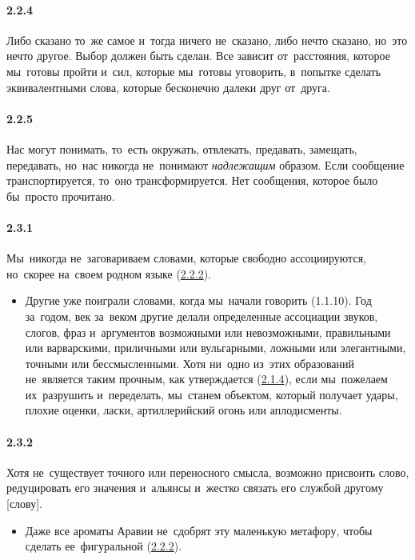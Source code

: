 \paragraph{2.2.4}\hypertarget{par:2.2.4}{} Либо сказано то~же самое и~тогда ничего не~сказано, либо нечто сказано, но~это нечто другое. Выбор должен быть сделан. Все зависит от~расстояния, которое мы~готовы пройти и~сил, которые мы~готовы уговорить, в~попытке сделать эквивалентными слова,
которые бесконечно далеки друг от~друга. 

\paragraph{2.2.5}\hypertarget{par:2.2.5}{} Нас могут понимать, то~есть окружать, отвлекать, предавать, замещать, передавать, но~нас никогда не~понимают {\itshape надлежащим} образом. Если сообщение транспортируется, то~оно трансформируется. Нет сообщения, которое было бы~просто прочитано.

\paragraph{2.3.1}\hypertarget{par:2.3.1}{} Мы~никогда не~заговариваем словами, которые свободно ассоциируются, но~скорее на~своем родном языке (\hyperlink{par:2.2.2}{2.2.2}). 
	\begin{itemize}
	\item 
	Другие уже поиграли словами, когда мы~начали говорить (1.1.10). Год за~годом, век за~веком другие делали определенные ассоциации звуков, слогов, фраз и~аргументов возможными или невозможными, правильными или варварскими, приличными или вульгарными, ложными или элегантными, точными или бессмысленными. Хотя ни~одно из~этих образований не~является таким прочным, как утверждается (\hyperlink{par:2.1.4}{2.1.4}), если мы~пожелаем их~разрушить и~переделать, мы~станем объектом, который получает удары, плохие оценки, ласки, артиллерийский огонь или аплодисменты.
	\end{itemize}

\paragraph{2.3.2}\hypertarget{par:2.3.2}{} Хотя не~существует точного или переносного смысла, возможно присвоить слово, редуцировать его значения и~альянсы и~жестко связать его службой другому [слову]. 
	\begin{itemize}
	\item 
	Даже все ароматы Аравии не~сдобрят эту маленькую метафору, чтобы сделать ее~фигуральной (\hyperlink{par:2.2.2}{2.2.2}). 
	\end{itemize}

